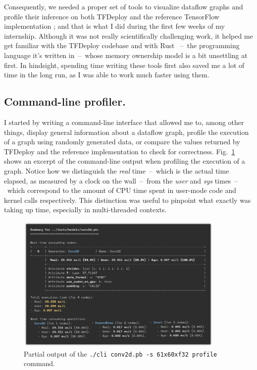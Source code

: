 \documentclass[11pt]{article}
\begin{document}
Consequently, we needed a proper set of tools to visualize dataflow graphs and profile their inference on both TFDeploy \cite{tfdeploy} and the reference TensorFlow implementation \cite{tensorflow}; and that is what I did during the first few weeks of my internship. Although it was not really scientifically challenging work, it helped me get familiar with the TFDeploy codebase and with Rust \cite{rust}~--~the programming language it's written in~--~whose memory ownership model is a bit unsettling at first. In hindsight, spending time writing these tools first also saved me a lot of time in the long run, as I was able to work much faster using them.

\subsection{Command-line profiler.}
I started by writing a command-line interface \cite{cli} that allowed me to, among other things, display general information about a dataflow graph, profile the execution of a graph using randomly generated data, or compare the values returned by TFDeploy and the reference implementation to check for correctness. Fig.~\ref{fig-tfdeploy-profiler} shows an excerpt of the command-line output when profiling the execution of a graph. Notice how we distinguish the \textit{real} time~--~which is the actual time elapsed, as measured by a clock on the wall~--~from the \textit{user} and \textit{sys} times~--~which correspond to the amount of CPU time spent in user-mode code and kernel calls respectively. This distinction was useful to pinpoint what exactly was taking up time, especially in multi-threaded contexts.

\bigskip
\begin{figure}[!h]
\centering
    \caption{Partial output of the \texttt{./cli conv2d.pb -s 61x60xf32 profile} command.}
    \label{fig-tfdeploy-profiler}
    \vspace{-.2em}
    \includegraphics[width=0.9\textwidth]{tfdeploy-profiler.png}
    \vspace{-1em}
\end{figure}
\end{document}
